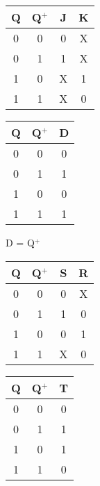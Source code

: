 \documentclass[a4paper]{article}
\begin{document}
\begin{justifying}
\begin{multicols}{2}
            \begin{multicols}{2}
                \begin{center}
                    \begin{tabular}{cc|cc}
                        Q & Q$^+$ & J & K \\
                        \hline
                        0 & 0 & 0 & X \\
                        0 & 1 & 1 & X \\
                        1 & 0 & X & 1 \\
                        1 & 1 & X & 0 \\
                    \end{tabular}
                
                    \begin{tabular}{cc|c}
                        Q & Q$^+$ & D \\
                        \hline
                        0 & 0 & 0 \\
                        0 & 1 & 1 \\
                        1 & 0 & 0 \\
                        1 & 1 & 1 \\
                    \end{tabular}
                
                    D = Q$^+$
                
                    \begin{tabular}{cc|cc}
                        Q & Q$^+$ & S & R \\
                        \hline
                        0 & 0 & 0 & X \\
                        0 & 1 & 1 & 0 \\
                        1 & 0 & 0 & 1 \\
                        1 & 1 & X & 0 \\
                    \end{tabular}
                
                    \begin{tabular}{cc|c}
                        Q & Q$^+$ & T \\
                        \hline
                        0 & 0 & 0 \\
                        0 & 1 & 1 \\
                        1 & 0 & 1 \\
                        1 & 1 & 0 \\
                    \end{tabular}
                

\end{center}
\end{multicols}
\end{multicols}
\end{justifying}
\end{document}
